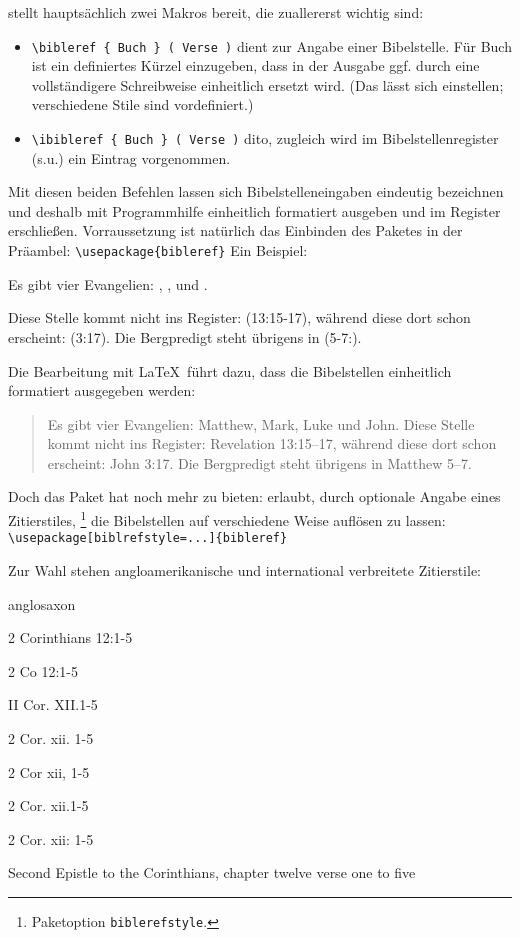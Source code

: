  stellt hauptsächlich zwei Makros bereit, die zuallererst wichtig sind:

\begin{itemize}
    \item \lstinline/\bibleref { Buch } ( Verse )/ dient zur Angabe einer Bibelstelle. 
    Für Buch ist ein definiertes Kürzel einzugeben, dass in der Ausgabe ggf. durch eine vollständigere
    Schreibweise einheitlich ersetzt wird. (Das lässt sich einstellen; verschiedene Stile sind vordefiniert.)
    \item \lstinline/\ibibleref { Buch } ( Verse )/ dito, zugleich wird im Bibelstellenregister (s.u.)
    ein Eintrag vorgenommen.
\end{itemize}

Mit diesen beiden Befehlen lassen sich Bibelstelleneingaben eindeutig bezeichnen und deshalb
mit Programmhilfe einheitlich formatiert ausgeben und im Register erschließen. 
Vorraussetzung ist natürlich das Einbinden des Paketes in der Präambel:
\lstinline/\usepackage{bibleref}/
Ein Beispiel: 

\begin{lfgwcode}
Es gibt vier Evangelien: 
, 
, 
 und .

Diese Stelle kommt nicht ins Register: (13:15-17), 
während diese dort schon erscheint: (3:17).
Die Bergpredigt steht übrigens in (5-7:).
\end{lfgwcode}

Die Bearbeitung mit \LaTeX\ führt dazu, dass die Bibelstellen einheitlich formatiert ausgegeben werden:

\begin{quotation}
    Es gibt vier Evangelien: Matthew, Mark, Luke und John.
    Diese Stelle kommt nicht ins Register: Revelation 13:15–17, während diese dort schon
    erscheint: John 3:17. Die Bergpredigt steht übrigens in Matthew 5–7.
\end{quotation}

Doch das Paket hat noch mehr zu bieten:
 erlaubt, durch optionale Angabe eines Zitierstiles,%
\footnote{Paketoption \lstinline|biblerefstyle|.}
die Bibelstellen auf verschiedene
Weise auflösen zu lassen:
\lstinline/\usepackage[biblrefstyle=...]{bibleref}/

Zur Wahl stehen angloamerikanische und international verbreitete Zitierstile:

\begin{labeling}{anglosaxon}
    \item[default] 2 Corinthians 12:1-5
    \item[jerusalem] 2 Co 12:1-5
    \item[anglosaxon] II Cor. XII.1-5
    \item[JEH] 2 Cor. xii. 1-5
    \item[NTG] 2 Cor xii, 1-5
    \item[MLA] 2 Cor. xii.1-5
    \item[chicago] 2 Cor. xii: 1-5
    \item[text] Second Epistle to the Corinthians, chapter twelve verse one to five
\end{labeling}

